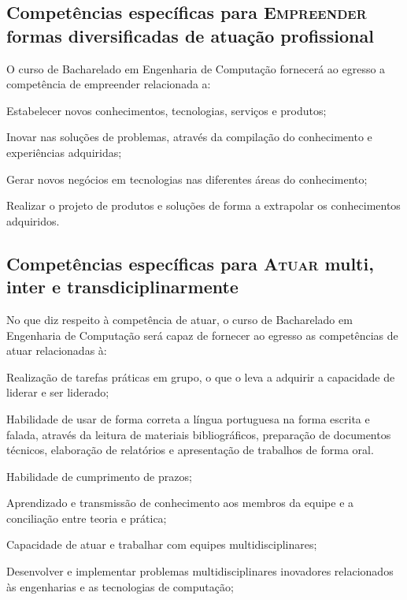 \subsection*{Competências específicas para \textsc{Empreender} formas diversificadas de atuação profissional}

O curso de Bacharelado em Engenharia de Computação fornecerá ao egresso a competência de empreender relacionada a:

\begin{compitem}
    \item Estabelecer novos conhecimentos, tecnologias, serviços e produtos;
    \item Inovar nas soluções de problemas, através da compilação do conhecimento e experiências adquiridas;
    \item Gerar novos negócios em tecnologias nas diferentes áreas do conhecimento; %
    \item Realizar o projeto de produtos e soluções de forma a extrapolar os conhecimentos adquiridos.
\end{compitem}

\subsection*{Competências específicas para \textsc{Atuar} multi, inter e transdiciplinarmente}

No que diz respeito à competência de atuar, o curso de Bacharelado em Engenharia de Computação será capaz de fornecer ao egresso as competências de atuar relacionadas à:

\begin{compitem}
    \item Realização de tarefas práticas em grupo, o que o leva a adquirir a capacidade de liderar e ser liderado;
    \item Habilidade de usar de forma correta a língua portuguesa na forma escrita e falada, através da leitura de materiais bibliográficos, preparação de documentos técnicos, elaboração de relatórios e apresentação de trabalhos de forma oral.
    \item Habilidade de cumprimento de prazos;
    \item Aprendizado e transmissão de conhecimento aos membros da equipe e a conciliação entre teoria e prática;
    \item Capacidade de atuar e trabalhar com equipes multidisciplinares;
    \item Desenvolver e implementar problemas multidisciplinares inovadores relacionados às engenharias e as tecnologias de computação;
\end{compitem}

